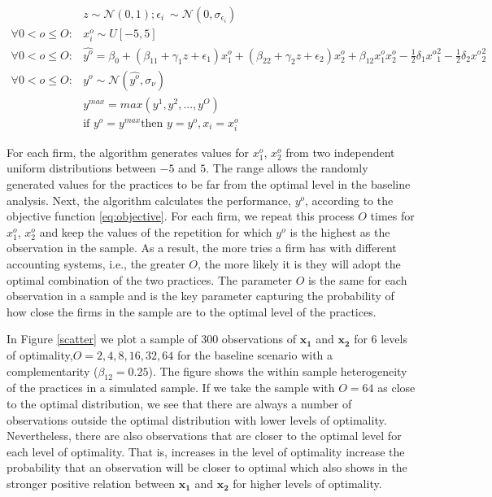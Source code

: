 \documentclass[12pt]{article}
\begin{document}
\begin{equation}\label{eq:firm-simulation}
\begin{aligned}
	&z \sim \mathcal{N}(0, 1); \epsilon_i ~ \sim \mathcal{N}(0, \sigma_{\epsilon_i}) \\
    \forall 0 < o \leq O: &x^o_i \sim U[-5,5] \\
    \forall 0 < o \leq O: &\hat{y^o} = \beta_0 + (\beta_{11} + \gamma_1 z + \epsilon_1) x^o_1 
						+ (\beta_{22} + \gamma_2 z  + \epsilon_2) x^o_2 
                        + \beta_{12} x^o_1 x^o_2 - \frac{1}{2}\delta_1 {x^o}^2_1 - \frac{1}{2}\delta_2 {x^o}^2_2 \\
     \forall 0 < o \leq O: &y^o \sim \mathcal{N}(\hat{y^o}, \sigma_{\nu}) \\
	 &y^{max} = max(y^1, y^2, ..., y^O)  \\
     &\text{if } y^o = y^{max} \text{then } y = y^o, x_i = x^o_i
\end{aligned}
\end{equation}


For each firm, the algorithm generates values for $x^o_{1}$, $x^o_{2}$ from two independent uniform distributions between $-5$ and $5$. The range allows the randomly generated values for the practices to be far from the optimal level in the baseline analysis. Next, the algorithm calculates the performance, $y^o$, according to the objective function \eqref{eq:objective}. For each firm, we repeat this process $O$ times for $x^o_{1}$, $x^o_{2}$ and keep the values of the repetition for which $y^o$ is the highest as the observation in the sample. As a result, the more tries a firm has with different accounting systems, i.e., the greater $O$, the more likely it is they will adopt the optimal combination of the two practices. The parameter $O$ is the same for each observation in a sample and is the key parameter capturing the probability of how close the firms in the sample are to the optimal level of the practices. 

In Figure \ref{scatter} we plot a sample of 300 observations of $\mathbf{x_1}$ and $\mathbf{x_2}$ for 6 levels of optimality,$O = 2, 4, 8, 16, 32, 64$ for the baseline scenario with a complementarity ($\beta_{12} = 0.25$). The figure shows the within sample heterogeneity of the practices in a simulated sample. If we take the sample with $O=64$ as close to the optimal distribution, we see that there are always a number of observations outside the optimal distribution with lower levels of optimality. Nevertheless, there are also observations that are closer to the optimal level for each level of optimality. That is, increases in the level of optimality increase the probability that an observation will be closer to optimal which also shows in the stronger positive relation between $\mathbf{x_1}$ and $\mathbf{x_2}$ for higher levels of optimality.
\end{document}
